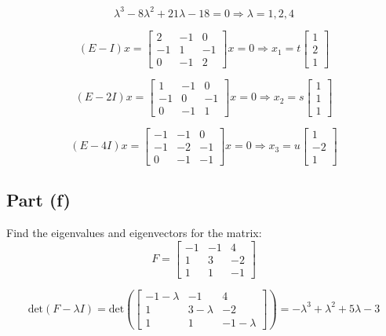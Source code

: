 \documentclass[12pt]{article}
\begin{document}
\[
  \lambda^3 - 8\lambda^2 + 21\lambda - 18 = 0 \Rightarrow \lambda = 1, 2, 4
\]

\[
  (E - I)x = \begin{bmatrix} 2 & -1 & 0 \\ -1 & 1 & -1 \\ 0 & -1 & 2 \end{bmatrix}x = 0 \Rightarrow x_1 = t\begin{bmatrix} 1 \\ 2 \\ 1 \end{bmatrix}
\]

\[
  (E - 2I)x = \begin{bmatrix} 1 & -1 & 0 \\ -1 & 0 & -1 \\ 0 & -1 & 1 \end{bmatrix}x = 0 \Rightarrow x_2 = s\begin{bmatrix} 1 \\ 1 \\ 1 \end{bmatrix}
\]

\[
  (E - 4I)x = \begin{bmatrix} -1 & -1 & 0 \\ -1 & -2 & -1 \\ 0 & -1 & -1 \end{bmatrix}x = 0 \Rightarrow x_3 = u\begin{bmatrix} 1 \\ -2 \\ 1 \end{bmatrix}
\]

\pagebreak

\subsection*{Part (f)}
Find the eigenvalues and eigenvectors for the matrix:
\[
  F = \begin{bmatrix} -1 & -1 & 4 \\ 1 & 3 & -2 \\ 1 & 1 & -1 \end{bmatrix}
\]

\[
  \text{det}(F - \lambda I) = \text{det}\left(\begin{bmatrix} -1-\lambda & -1 & 4 \\ 1 & 3-\lambda & -2 \\ 1 & 1 & -1-\lambda \end{bmatrix}\right) = -\lambda^3 + \lambda^2 + 5\lambda - 3
\]
\end{document}
